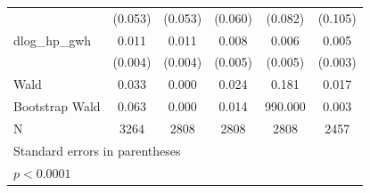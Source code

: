 \begin{table}[htbp]
\begin{tabular}{l*{5}{c}}
            &     (0.053)       &     (0.053)       &     (0.060)       &     (0.082)       &     (0.105)       \\
[1em]
dlog\_hp\_gwh &       0.011       &       0.011       &       0.008       &       0.006       &       0.005       \\
            &     (0.004)       &     (0.004)       &     (0.005)       &     (0.005)       &     (0.003)       \\
\hline
Wald        &       0.033       &       0.000       &       0.024       &       0.181       &       0.017       \\
Bootstrap Wald&       0.063       &       0.000       &       0.014       &     990.000       &       0.003       \\
N           &        3264       &        2808       &        2808       &        2808       &        2457       \\
\hline\hline
\multicolumn{6}{l}{\footnotesize Standard errors in parentheses}\\
\multicolumn{6}{l}{\footnotesize \sym{*} \(p<0.0001\)}\\
\end{tabular}
\end{table}
